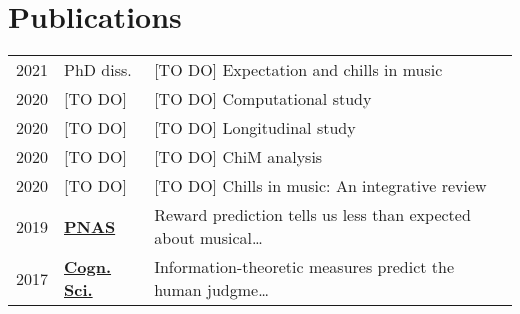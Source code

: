 \documentclass[]{deedy-resume-openfont}
\begin{document}
\begin{minipage}[t]{0.66\textwidth}
\section{Publications} 
\begin{tabular}{rll}
2021 & PhD diss. & [TO DO] Expectation and chills in music \\
2020 & [TO DO] & [TO DO] Computational study \\
2020 & [TO DO] & [TO DO] Longitudinal study \\
2020 & [TO DO] & [TO DO] ChiM analysis\\
2020 & [TO DO] & [TO DO] Chills in music: An integrative review \\
2019 & \textbf{\href{https://remidefleurian.com/publication/2019-pnas/}{PNAS}} & Reward prediction tells us less than expected about musical\ldots  \\
2017 & \textbf{\href{https://remidefleurian.com/publication/2017-cognsci/}{Cogn. Sci.}} & Information-theoretic measures predict the human judgme\ldots \\
\end{tabular}

\end{minipage} 
\end{document}
